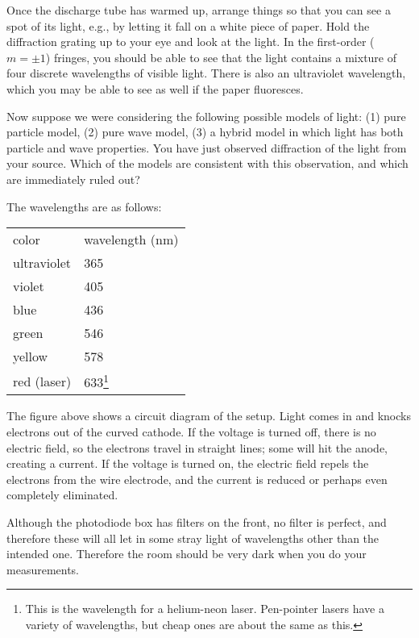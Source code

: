Once the discharge tube has warmed up, arrange things so that you can see a spot of its light, e.g., by
letting it fall on a white piece of paper. Hold the diffraction grating up to your eye and look at the
light. In the first-order ($m=\pm1$) fringes, you should be able to see that the light contains a
mixture of four discrete wavelengths of visible light. There is also an ultraviolet wavelength,
which you may be able to see as well if the paper fluoresces.

Now suppose we were considering the following possible models of light: (1) pure particle model,
(2) pure wave model, (3) a hybrid model in which light has both particle and
wave properties. You have just observed diffraction of the light
from your source. Which of the models are consistent with this observation, and which are immediately
ruled out?

The wavelengths are as follows:\label{hg-wavelengths}

\begin{tabular}{ll}
color   &wavelength (nm)\\
ultraviolet &  365\\
violet   &405\\
blue   &436\\
green  & 546\\
yellow  & 578 \\
red (laser) & 633\footnote{This is the wavelength for a helium-neon laser. Pen-pointer lasers have a variety
of wavelengths, but cheap ones are about the same as this.}
\end{tabular}



The figure above shows a circuit diagram of the setup. Light comes in and knocks
electrons out of the curved cathode. If the voltage is
turned off, there is no electric field, so the electrons
travel in straight lines; some will hit the anode, creating
a current. If the voltage is
turned on, the electric field repels the electrons from the
wire electrode, and the current is reduced or perhaps even completely eliminated.

\observations

Although the photodiode box has filters on the front, no filter is perfect, and therefore these will
all let in some stray light of wavelengths other than the intended one. Therefore
the room should be very dark when you do your measurements.

